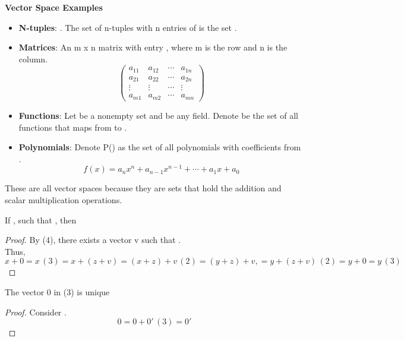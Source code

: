 \documentclass{article}
\begin{document}
\textbf{Vector Space Examples}
\begin{itemize}
    \item \textbf{N-tuples}: . The set of n-tuples with n entries of  is the set .
    \item \textbf{Matrices}: An m x n matrix with entry , where m is the row and n is the column.\\
    \[
    \begin{pmatrix}
        a_{11} & a_{12} & \cdots & a_{1n} \\
        a_{21} & a_{22} & \cdots & a_{2n} \\
        \vdots & \vdots & \cdots & \vdots \\ 
        a_{m1} & a_{m2} & \cdots & a_{mn}
    \end{pmatrix}
    \]
    \item \textbf{Functions}: Let  be a nonempty set and  be any field. Denote  be the set of all functions that maps from  to .
    \item \textbf{Polynomials}: Denote P() as the set of all polynomials with coefficients from .
    \[
        f(x) = a_nx^n + a_{n-1}x^{n-1} + \cdots + a_1 x + a_0
    \]
\end{itemize}

\mm{\star} These are all vector spaces because they are sets that hold the addition and scalar multiplication operations.

\begin{theorem}
If , such that , then 
\end{theorem}
\begin{proof}
    By (4), there exists a vector v such that . \\
    Thus, \[x + 0 = x \, (3) = x + (z + v) = (x + z) + v \, (2) = (y + z) + v, = y + (z + v) \, (2) = y + 0 = y \, (3)\]
\end{proof}

\begin{corollary}
    The vector 0 in (3) is unique
\end{corollary}
\begin{proof}
    Consider .
    \[
    0 = 0 + 0' \, (3) = 0'
    \]
\end{proof}
\end{document}
